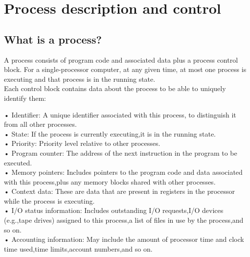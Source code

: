 
\chapter{Process description and control}

\section{What is a process?}

A process consists of program code and associated data plus a process control block. For a single-processor computer, at any given time, at
most one process is executing and that process is in the running state.\\

Each control block contains data about the process to be able to uniquely identify them:

• Identifier: A unique identifier associated with this process, to distinguish it
from all other processes.\\
• State: If the process is currently executing,it is in the running state.\\
• Priority: Priority level relative to other processes.\\
• Program counter: The address of the next instruction in the program to be
executed.\\
• Memory pointers: Includes pointers to the program code and data associated
with this process,plus any memory blocks shared with other processes.\\
• Context data: These are data that are present in registers in the processor
while the process is executing.\\
• I/O status information: Includes outstanding I/O requests,I/O devices (e.g.,tape
drives) assigned to this process,a list of files in use by the process,and so on.\\
• Accounting information: May include the amount of processor time and clock
time used,time limits,account numbers,and so on.\\


